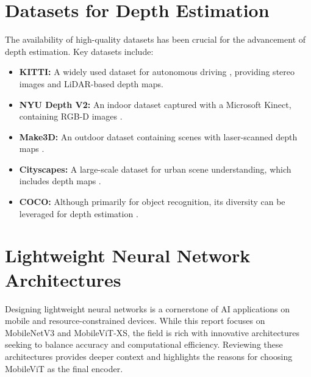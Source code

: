 \section{Datasets for Depth Estimation}
\label{sec:datasets}

The availability of high-quality datasets has been crucial for the advancement of depth estimation. Key datasets include:
\begin{itemize}
    \item \textbf{KITTI:} A widely used dataset for autonomous driving \cite{geiger2012we}, providing stereo images and LiDAR-based depth maps.
    \item \textbf{NYU Depth V2:} An indoor dataset captured with a Microsoft Kinect, containing RGB-D images \cite{silberman2012indoor}.
    \item \textbf{Make3D:} An outdoor dataset containing scenes with laser-scanned depth maps \cite{saxena20083}.
    \item \textbf{Cityscapes:} A large-scale dataset for urban scene understanding, which includes depth maps \cite{cordts2016cityscapes}.
    \item \textbf{COCO:} Although primarily for object recognition, its diversity can be leveraged for depth estimation \cite{lin2014microsoft}.
\end{itemize}

\section{Lightweight Neural Network Architectures}
\label{sec:architectures}

Designing lightweight neural networks is a cornerstone of AI applications on mobile and resource-constrained devices. While this report focuses on MobileNetV3 and MobileViT-XS, the field is rich with innovative architectures seeking to balance accuracy and computational efficiency. Reviewing these architectures provides deeper context and highlights the reasons for choosing MobileViT as the final encoder.

